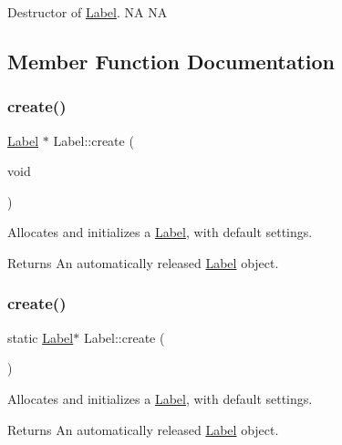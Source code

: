 Destructor of \hyperlink{classLabel}{Label}.  NA  NA 

\subsection{Member Function Documentation}
\mbox{\label{classLabel_a9e20a505142eec1c1a4315ddba0d56b5}} 
\subsubsection{\texorpdfstring{create()}{create()}\hspace{0.1cm}{\footnotesize\ttfamily [1/2]}}
{\footnotesize\ttfamily \hyperlink{classLabel}{Label} $\ast$ Label\+::create (\begin{DoxyParamCaption}\item[{void}]{ }\end{DoxyParamCaption})\hspace{0.3cm}{\ttfamily [static]}}

Allocates and initializes a \hyperlink{classLabel}{Label}, with default settings.

\begin{DoxyReturn}{Returns}
An automatically released \hyperlink{classLabel}{Label} object. 
\end{DoxyReturn}
\mbox{\label{classLabel_ab071a3f4ccdf8122b1c0c9802b17d009}} 
\subsubsection{\texorpdfstring{create()}{create()}\hspace{0.1cm}{\footnotesize\ttfamily [2/2]}}
{\footnotesize\ttfamily static \hyperlink{classLabel}{Label}$\ast$ Label\+::create (\begin{DoxyParamCaption}{ }\end{DoxyParamCaption})\hspace{0.3cm}{\ttfamily [static]}}

Allocates and initializes a \hyperlink{classLabel}{Label}, with default settings.

\begin{DoxyReturn}{Returns}
An automatically released \hyperlink{classLabel}{Label} object. 
\end{DoxyReturn}
\mbox{\label{classLabel_a15adf4af0d7f68599e4aa905c8609574}} 
